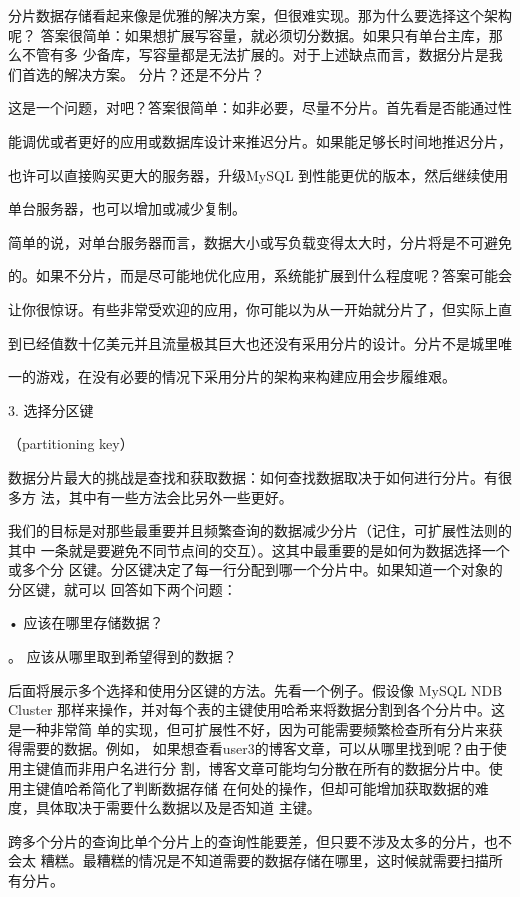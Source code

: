分片数据存储看起来像是优雅的解决方案，但很难实现。那为什么要选择这个架构呢？
答案很简单：如果想扩展写容量，就必须切分数据。如果只有单台主库，那么不管有多
少备库，写容量都是无法扩展的。对于上述缺点而言，数据分片是我们首选的解决方案。
分片？还是不分片？

这是一个问题，对吧？答案很简单：如非必要，尽量不分片。首先看是否能通过性

能调优或者更好的应用或数据库设计来推迟分片。如果能足够长时间地推迟分片，

也许可以直接购买更大的服务器，升级MySQL 到性能更优的版本，然后继续使用

单台服务器，也可以增加或减少复制。

简单的说，对单台服务器而言，数据大小或写负载变得太大时，分片将是不可避免

的。如果不分片，而是尽可能地优化应用，系统能扩展到什么程度呢？答案可能会

让你很惊讶。有些非常受欢迎的应用，你可能以为从一开始就分片了，但实际上直

到已经值数十亿美元并且流量极其巨大也还没有采用分片的设计。分片不是城里唯

一的游戏，在没有必要的情况下采用分片的架构来构建应用会步履维艰。

3. 选择分区键

（partitioning key）

数据分片最大的挑战是查找和获取数据：如何查找数据取决于如何进行分片。有很多方
法，其中有一些方法会比另外一些更好。

我们的目标是对那些最重要并且频繁查询的数据减少分片（记住，可扩展性法则的其中
一条就是要避免不同节点间的交互）。这其中最重要的是如何为数据选择一个或多个分
区键。分区键决定了每一行分配到哪一个分片中。如果知道一个对象的分区键，就可以
回答如下两个问题：

• 应该在哪里存储数据？

。 应该从哪里取到希望得到的数据？

后面将展示多个选择和使用分区键的方法。先看一个例子。假设像 MySQL NDB Cluster
那样来操作，并对每个表的主键使用哈希来将数据分割到各个分片中。这是一种非常简
单的实现，但可扩展性不好，因为可能需要频繁检查所有分片来获得需要的数据。例如，
如果想查看user3的博客文章，可以从哪里找到呢？由于使用主键值而非用户名进行分
割，博客文章可能均匀分散在所有的数据分片中。使用主键值哈希简化了判断数据存储
在何处的操作，但却可能增加获取数据的难度，具体取决于需要什么数据以及是否知道
主键。

跨多个分片的查询比单个分片上的查询性能要差，但只要不涉及太多的分片，也不会太
糟糕。最糟糕的情况是不知道需要的数据存储在哪里，这时候就需要扫描所有分片。

